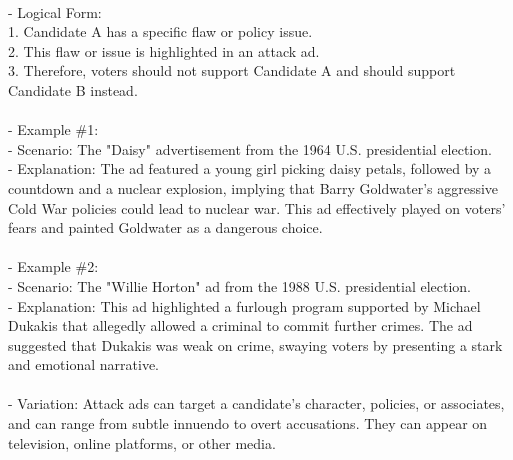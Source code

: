 \documentclass[a4paper,12pt,single,pdftex]{scrbook}
\begin{document}
    
      
    \\

    
      - Logical Form:
    \\

    
        1. Candidate A has a specific flaw or policy issue.
    \\

    
        2. This flaw or issue is highlighted in an attack ad.
    \\

    
        3. Therefore, voters should not support Candidate A and should support Candidate B instead.
    \\

    
      
    \\

    
      - Example \#1:
    \\

    
        - Scenario: The "Daisy" advertisement from the 1964 U.S. presidential election.
    \\

    
        - Explanation: The ad featured a young girl picking daisy petals, followed by a countdown and a nuclear explosion, implying that Barry Goldwater's aggressive Cold War policies could lead to nuclear war. This ad effectively played on voters' fears and painted Goldwater as a dangerous choice.
    \\

    
      
    \\

    
      - Example \#2:
    \\

    
        - Scenario: The "Willie Horton" ad from the 1988 U.S. presidential election.
    \\

    
        - Explanation: This ad highlighted a furlough program supported by Michael Dukakis that allegedly allowed a criminal to commit further crimes. The ad suggested that Dukakis was weak on crime, swaying voters by presenting a stark and emotional narrative.
    \\

    
      
    \\

    
      - Variation: Attack ads can target a candidate's character, policies, or associates, and can range from subtle innuendo to overt accusations. They can appear on television, online platforms, or other media.
    \\
\end{document}
